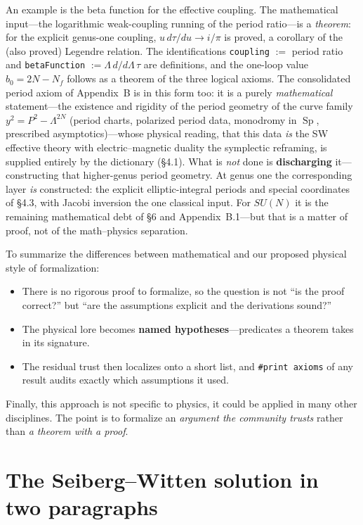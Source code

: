 \documentclass{article}
\theoremstyle{plain}
\theoremstyle{definition}
\numberwithin{equation}{section}
\newcommand{\Sp}{\operatorname{Sp}}
\newcommand{\code}[1]{\texttt{#1}}
\begin{document}
An example is the beta function for the effective
coupling.  The mathematical input---the logarithmic weak-coupling running of the period
ratio---is a \emph{theorem}: for the explicit genus-one coupling,
$u\,d\tau/du \to i/\pi$ is proved, a corollary of the (also proved) Legendre relation.  The
identifications \code{coupling} $:=$ period ratio and
\code{betaFunction} $:= \Lambda\, d/d\Lambda\, \tau$ are definitions, and the one-loop value
$b_0 = 2N - N_f$ follows as a theorem of the three logical axioms. The consolidated period axiom of Appendix~B is in this form too: it is a
purely \emph{mathematical} statement---the existence and rigidity of the period geometry of the curve
family $y^2 = P^2 - \Lambda^{2N}$ (period charts, polarized period data, monodromy in $\Sp$,
prescribed asymptotics)---whose physical reading, that this data \emph{is} the SW effective theory
with electric--magnetic duality the symplectic reframing, is supplied entirely by the dictionary
(\S4.1). What is \emph{not} done is \textbf{discharging} it---constructing that
higher-genus period geometry. At genus one the corresponding layer \emph{is}
constructed: the explicit elliptic-integral periods and special coordinates of \S4.3,
with Jacobi inversion the one classical input. For $SU(N)$ it is the remaining
mathematical debt of \S6 and Appendix~B.1---but that is a matter of proof, not of the
math--physics separation.

To summarize the differences between mathematical and our proposed physical style of formalization:
\begin{itemize}
\item There is no rigorous proof to formalize, so the
question is not ``is the proof correct?'' but ``are the assumptions explicit and the derivations
sound?''
\item The physical lore becomes \textbf{named hypotheses}---predicates a theorem takes in its
signature. 
\item The residual trust then localizes onto a short list, and \code{\#print axioms} of any
result audits exactly which assumptions it used.
\end{itemize}
Finally, this approach is not specific to physics, it could be applied in many other disciplines.
The point is to formalize an \emph{argument the community trusts} rather than \emph{a theorem with a proof}.

\section{The Seiberg--Witten solution in two paragraphs}
\end{document}
